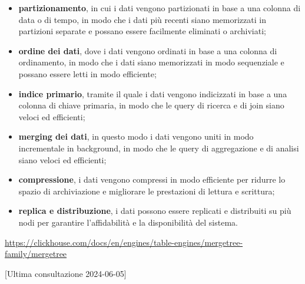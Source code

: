 \begin{itemize}
	\item \textbf{partizionamento}, in cui i dati vengono partizionati in base a una colonna di data o di tempo, in modo che i dati più recenti siano memorizzati in partizioni separate e possano essere facilmente eliminati o archiviati;
	\item \textbf{ordine dei dati}, dove i dati vengono ordinati in base a una colonna di ordinamento, in modo che i dati siano memorizzati in modo sequenziale e possano essere letti in modo efficiente;
	\item \textbf{indice primario}, tramite il quale i dati vengono indicizzati in base a una colonna di chiave primaria, in modo che le query di ricerca e di join siano veloci ed efficienti;
	\item \textbf{merging dei dati}, in questo modo i dati vengono uniti in modo incrementale in background, in modo che le query di aggregazione e di analisi siano veloci ed efficienti;
	\item \textbf{compressione}, i dati vengono compressi in modo efficiente per ridurre lo spazio di archiviazione e migliorare le prestazioni di lettura e scrittura;
	\item \textbf{replica e distribuzione}, i dati possono essere replicati e distribuiti su più nodi per garantire l'affidabilità e la disponibilità del sistema.
\end{itemize}
\url{https://clickhouse.com/docs/en/engines/table-engines/mergetree-family/mergetree}

[Ultima consultazione 2024-06-05]


